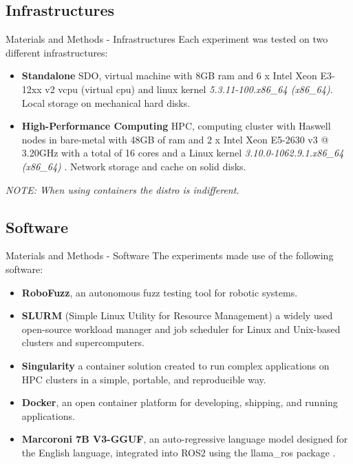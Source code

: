 \documentclass[aspectratio=169]{beamer}
\begin{document}
 \subsection{Infrastructures}
\begin{frame}{Materials and Methods - Infrastructures}
Each experiment was tested on two different infrastructures:
\begin{itemize}
    \item \textbf{Standalone} SDO,  virtual machine with 8GB ram and 6 x Intel Xeon E3-12xx v2 vcpu (virtual cpu) and linux kernel \textit{5.3.11-100.x86\_64 (x86\_64)}. Local storage on mechanical hard disks.
  
    \item \textbf{High-Performance Computing} HPC, computing cluster with Haswell nodes in bare-metal with 48GB of ram and 2 x Intel Xeon E5-2630 v3 @ 3.20GHz with a total of 16 cores and a Linux kernel \textit{3.10.0-1062.9.1.x86\_64 (x86\_64) } .
      Network storage and cache on solid disks. %
      
\end{itemize}
\textit{NOTE: When using containers the distro is indifferent.}
\end{frame}
 
 \subsection{Software}
\begin{frame}{Materials and Methods - Software}
The experiments made use of the following software:

\begin{itemize}
    \item \textbf{RoboFuzz}, an autonomous fuzz testing tool for robotic systems. 
    \item \textbf{SLURM} (Simple Linux Utility for Resource Management) a widely used open-source workload manager and job scheduler for Linux and Unix-based clusters and supercomputers.
    \item \textbf{Singularity} a container solution created to run complex applications on HPC clusters in a simple, portable, and reproducible way.
    \item \textbf{Docker}, an open container platform for developing, shipping, and running applications.
    \item \textbf{Marcoroni 7B V3-GGUF}, an auto-regressive language model designed for the English language, integrated into ROS2 using the llama\_ros package  .    
\end{itemize}

\end{frame}
\end{document}
